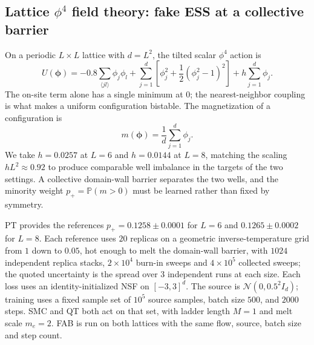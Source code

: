 \documentclass{article}
\begin{document}
\subsection{Lattice \texorpdfstring{$\phi^4$}{phi4} field theory: fake ESS at a collective barrier}
\label{subsec: phi4}
On a periodic $L\times L$ lattice with $d=L^2$, the tilted scalar $\phi^4$ action is
\begin{equation*}
U(\boldsymbol\phi)
=-0.8\sum_{\langle jl\rangle}\phi_j\phi_l
+\sum_{j=1}^{d}\left[\phi_j^2+\frac12(\phi_j^2-1)^2\right]
+h\sum_{j=1}^{d}\phi_j.
\end{equation*}
The on-site term alone has a single minimum at $0$; the nearest-neighbor coupling is what makes a uniform configuration bistable. The magnetization of a configuration is
\begin{equation*}
    m(\boldsymbol\phi)=\frac1d\sum_{j=1}^{d}\phi_j .
\end{equation*}
We take $h=0.0257$ at $L=6$ and $h=0.0144$ at $L=8$, matching the scaling $hL^2\approx0.92$ to produce comparable well imbalance in the targets of the two settings.
A collective domain-wall barrier separates the two wells, and the minority weight $p_+=\mathbb P(m>0)$ must be learned rather than fixed by symmetry.

PT provides the references $p_+=0.1258\pm0.0001$ for $L=6$ and $0.1265\pm0.0002$ for $L=8$. Each reference uses $20$ replicas on a geometric inverse-temperature grid from $1$ down to $0.05$, hot enough to melt the domain-wall barrier, with $1024$ independent replica stacks, $2\times10^4$ burn-in sweeps and $4\times10^5$ collected sweeps; the quoted uncertainty is the spread over 3 independent runs at each size. Each loss uses an identity-initialized NSF on $[-3,3]^d$. The source is $\mathcal N(0,0.5^2 I_d)$; training uses a fixed sample set of $10^5$ source samples, batch size $500$, and $2000$ steps. SMC and QT both act on that set, with ladder length $M=1$ and melt scale $m_e=2$. FAB is run on both lattices with the same flow, source, batch size and step count.
\end{document}
